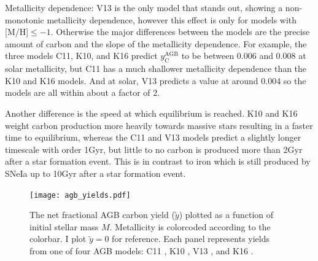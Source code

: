 \documentclass[12pt,oneside]{report}
\begin{document}
Metallicity dependence:
V13 is the only model that stands out, showing a non-monotonic metallicity dependence, however this effect is only for models with [M/H]$\leq -1$. Otherwise the major differences between the models are the precise amount of carbon and the slope of the metallicity dependence. For example, the three models C11, K10, and K16 predict $y_\text{C}^\text{AGB}$ to be between 0.006 and 0.008 at solar metallicity, but C11 has a much shallower metallicity dependence than the K10 and K16 models. And at solar, V13 predicts a value at around 0.004 so the models are all within about a factor of 2. 

Another difference is the speed at which equilibrium is reached. K10 and K16 weight carbon production more heavily towards massive stars resulting in a faster time to equilibrium, whereas the C11 and V13 models predict a slightly longer timescale with order 1Gyr, but little to no carbon is produced more than 2Gyr after a star formation event. This is in contrast to iron which is still produced by SNeIa up to 10Gyr after a star formation event. 

\begin{figure}
    \centering
 	    \texttt{[image: agb\_yields.pdf]}\\

        \caption[AGB carbon yields]{The net fractional AGB carbon yield ($\tilde{y}$) plotted as a function of initial stellar mass $M$. Metallicity is colorcoded according to the colorbar. I plot $\tilde{y}=0$ for reference. Each panel represents yields from one of four AGB models: C11 \citep{cristallo+11, cristallo+15}, K10 \citep{karakas10}, V13 \citep{ventura+13,ventura+14,ventura+18}, and K16 \citep{KL16, karakas+18}.
        }
            \label{fig:y_agb}
\end{figure}
\end{document}
